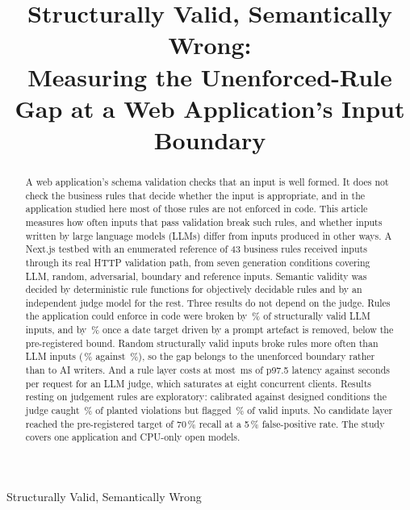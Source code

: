 \documentclass[journal]{IEEEtran}
\begin{document}
\title{Structurally Valid, Semantically Wrong:\\Measuring the Unenforced-Rule Gap at a Web Application's Input Boundary}

\author{}

%
{Structurally Valid, Semantically Wrong}

\maketitle

\begin{abstract}
A web application's schema validation checks that an input is well formed. It does not check the
business rules that decide whether the input is appropriate, and in the application studied here most
of those rules are not enforced in code. This article measures how often inputs that pass validation
break such rules, and whether inputs written by large language models (LLMs) differ from inputs
produced in other ways. A Next.js testbed with an enumerated reference of 43 business rules received
 inputs through its real HTTP validation path, from seven generation conditions covering
LLM, random, adversarial, boundary and reference inputs. Semantic validity was decided by deterministic rule functions for objectively decidable rules and by
an independent judge model for the rest. Three results do not depend on the judge. Rules the
application could enforce in code were broken by \,\% of structurally valid LLM
inputs, and by \,\% once a date target driven by a prompt artefact is removed,
below the pre-registered bound. Random structurally valid inputs broke rules more often than LLM
inputs (\,\% against \,\%), so the gap belongs to the unenforced boundary
rather than to AI writers. And a rule layer costs at most \,ms of p97.5 latency
against seconds per request for an LLM judge, which saturates at eight concurrent clients. Results
resting on judgement rules are exploratory: calibrated against designed conditions the judge caught
\,\% of planted violations but flagged \,\% of valid inputs. No candidate
layer reached the pre-registered target of 70\,\% recall at a 5\,\% false-positive rate. The study
covers one application and CPU-only open models.
\end{abstract}
\end{document}
